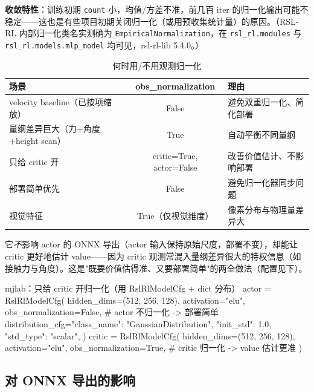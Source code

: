 \textbf{收敛特性}：训练初期 \verb|count| 小，均值/方差不准，前几百 iter 的归一化输出可能不稳定——这也是有些项目初期关闭归一化（或用预收集统计量）的原因。（RSL-RL 内部归一化类名实测确为 \verb|EmpiricalNormalization|，在 \verb|rsl_rl.modules| 与 \verb|rsl_rl.models.mlp_model| 均可见，rsl-rl-lib 5.4.0。）

\begin{table}[H]
\centering
\caption{何时用/不用观测归一化}
\label{tab:rlmc-obsnorm-when}
\begin{tabular}{p{4.6cm}cp{4.4cm}}
\hline
场景 & obs\_normalization & 理由 \\
\hline
velocity baseline（已按项缩放） & False & 避免双重归一化、简化部署 \\
量纲差异巨大（力+角度+height scan） & True & 自动平衡不同量纲 \\
只给 critic 开 & critic=True, actor=False & 改善价值估计、不影响部署 \\
部署简单优先 & False & 避免归一化器同步问题 \\
视觉特征 & True（仅视觉维度） & 像素分布与物理量差异大 \\
\hline
\end{tabular}
\end{table}

\begin{insight}\label{ins:rlmc-critic-norm}
它\emph{不}影响 actor 的 ONNX 导出（actor 输入保持原始尺度，部署不变），却能让 critic 更好地估计 value——因为 critic 观测常混入量纲差异很大的特权信息（如接触力与角度）。这是"既要价值估得准、又要部署简单"的两全做法（配置见下）。
\end{insight}

\begin{codebox}[Python]{mjlab：只给 critic 开归一化（用 RslRlModelCfg + dict 分布）}
actor = RslRlModelCfg(
    hidden_dims=(512, 256, 128), activation="elu",
    obs_normalization=False,         # actor 不归一化 -> 部署简单
    distribution_cfg={"class_name": "GaussianDistribution",
                      "init_std": 1.0, "std_type": "scalar"},
)
critic = RslRlModelCfg(
    hidden_dims=(512, 256, 128), activation="elu",
    obs_normalization=True,          # critic 归一化 -> value 估计更准
)
\end{codebox}

\subsection{对 ONNX 导出的影响}

